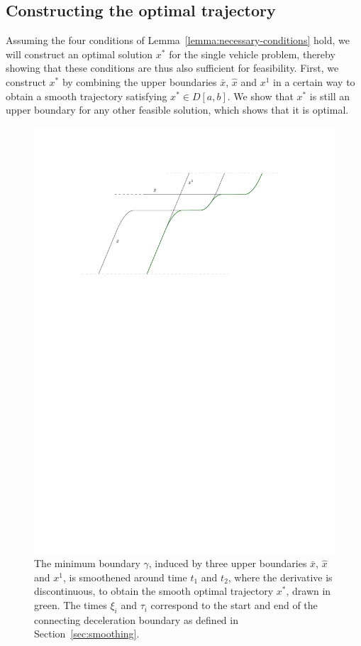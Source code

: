 \documentclass[a4paper]{article}
\theoremstyle{definition}
\theoremstyle{plain}
\begin{document}
\pagebreak

\subsection{Constructing the optimal trajectory}

Assuming the four conditions of Lemma~\ref{lemma:necessary-conditions} hold, we will construct an optimal
solution $x^{*}$ for the single vehicle problem, thereby showing that these
conditions are thus also sufficient for feasibility.
%
First, we construct $x^{*}$ by combining the upper boundaries $\bar{x}$,
$\hat{x}$ and $x^{1}$ in a certain way to obtain a smooth trajectory satisfying
$x^{*} \in D[a,b]$.
%
We show that $x^{*}$ is still an upper boundary for any other feasible solution,
which shows that it is optimal.

\begin{figure}
  \centering
  \includegraphics[scale=1]{figures/motion/rough/proof}
  \caption{The minimum boundary $\gamma$, induced by three upper boundaries
    $\bar{x}$, $\hat{x}$ and $x^{1}$, is smoothened around time $t_{1}$ and
    $t_{2}$, where the derivative is discontinuous, to obtain the smooth optimal
    trajectory $x^{*}$, drawn in green. The times $\xi_{i}$ and $\tau_{i}$
    correspond to the start and end of the connecting deceleration boundary as
    defined in Section~\ref{sec:smoothing}.}%
  \label{fig:optimal-construction}
\end{figure}
\end{document}
